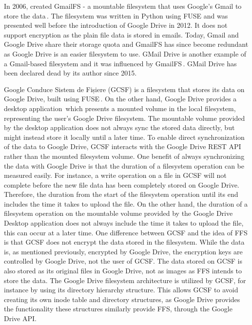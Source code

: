 In 2006, \citeauthor{jonesGoogleHackUse2006} created GmailFS - a mountable filesystem that uses Google's Gmail to store the data\,\cite{jonesGoogleHackUse2006, jonesGmailFilesystemImplementation2006}. The filesystem was written in Python using FUSE and was presented well before the introduction of Google Drive in 2012. It does not support encryption as the plain file data is stored in emails. Today, Gmail and Google Drive share their storage quota and GmailFS has since become redundant as Google Drive is an easier filesystem to use. GMail Drive is another example of a Gmail-based filesystem and it was influenced by GmailFS\,\cite{viksoeViksoeDkGMail2004}. GMail Drive has been declared dead by its author since 2015.

Google Conduce Sistem de Fișiere (\gls{GCSF}) is a filesystem that stores its data on Google Drive, built using FUSE\,\cite{puscassergiudanGCSFVIRTUALFILE2018,puscasHarababurelGcsf2022}. On the other hand, Google Drive provides a desktop application\,\cite{googleInstallSetGoogle} which presents a mounted volume in the local filesystem, representing the user's Google Drive filesystem. The mountable volume provided by the desktop application does not always sync the stored data directly, but might instead store it locally until a later time. To enable direct synchronization of the data to Google Drive, GCSF interacts with the Google Drive REST API rather than the mounted filesystem volume. One benefit of always synchronizing the data with Google Drive is that the duration of a filesystem operation can be measured easily. For instance, a write operation on a file in GCSF will not complete before the new file data has been completely stored on Google Drive. Therefore, the duration from the start of the filesystem operation until its end includes the time it takes to upload the file. On the other hand, the duration of a filesystem operation on the mountable volume provided by the Google Drive Desktop application does not always include the time it takes to upload the file, this can occur at a later time. One difference between GCSF and the idea of FFS is that GCSF does not encrypt the data stored in the filesystem. While the data is, as mentioned previously, encrypted by Google Drive, the encryption keys are controlled by Google Drive, not the user of GCSF. The data stored on GCSF is also stored as its original files in Google Drive, not as images as FFS intends to store the data. The Google Drive filesystem architecture is utilized by GCSF, for instance by using its directory hierarchy structure. This allows GCSF to avoid creating its own inode table and directory structures, as Google Drive provides the functionality these structures similarly provide FFS, through the Google Drive API.

